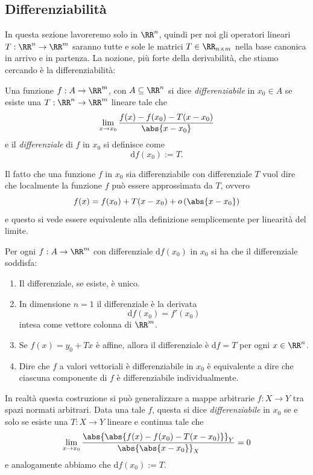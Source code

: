 \documentclass[11pt]{scrartcl}
\newcommand{\dif}{\text{d}}
\begin{document}
	\subsection{Differenziabilità}
	In questa sezione lavoreremo solo in $\RR^n$, quindi per noi gli operatori lineari $T:\RR^n\to\RR^m$ saranno tutte e sole le matrici $T\in \RR_{n\times m}$ nella base canonica in arrivo e in partenza. La nozione, più forte della derivabilità, che stiamo cercando è la differenziabilità:
	\begin{definition}[Differenziabilità]
		Una funzione $f:A\to\RR^m$, con $A\subseteq \RR^n$ si dice \textit{differenziabile} in $x_0\in A$ se esiste una $T:\RR^n\to\RR^m$ lineare tale che 
		$$\lim_{x\to x_0}\frac{f(x)-f(x_0)-T(x-x_0)}{\abs{x-x_0}}$$
		e il \textit{differenziale} di $f$ in $x_0$ si definisce come 
		$$\dif f(x_0):=T.$$ 
	\end{definition} 
	Il fatto che una funzione $f$ in $x_0$ sia differenziabile con differenziale $T$ vuol dire che localmente la funzione $f$ può essere approssimata da $T$, ovvero
	$$f(x)=f(x_0)+T(x-x_0)+o\left(\abs{x-x_0}\right)$$
	e questo si vede essere equivalente alla definizione semplicemente per linearità del limite.
	\begin{proposition}
		Per ogni $f:A\to \RR^m$ con differenziale $\dif f(x_0)$ in $x_0$ si ha che il differenziale soddisfa:
		\begin{enumerate}
			\item Il differenziale, se esiste, è unico.
			\item In dimensione $n=1$ il differenziale è la derivata
			$$\dif f(x_0)=f'(x_0)$$
			intesa come vettore colonna di $\RR^m$.
			\item Se $f(x)=y_0+Tx$ è affine, allora il differenziale è $\dif f = T$ per ogni $x\in \RR^n$.
			\item Dire che $f$ a valori vettoriali è differenziabile in $x_0$ è equivalente a dire che ciascuna componente di $f$ è differenziabile individualmente.
		\end{enumerate}
	\end{proposition}
	\begin{remark}
		In realtà questa costruzione si può generalizzare a mappe arbitrarie $f:X\to Y$ tra spazi normati arbitrari. Data una tale $f$, questa si dice \textit{differenziabile} in $x_0$ se e solo se esiste una $T:X\to Y$ lineare e continua tale che
		$$\lim_{x\to x_0}\frac{\abs{\abs{f(x)-f(x_0)-T(x-x_0)}}_Y}{\abs{\abs{x-x_0}}_X}=0$$
		e analogamente abbiamo che $\dif f(x_0):=T$.
	\end{remark}
\end{document}
